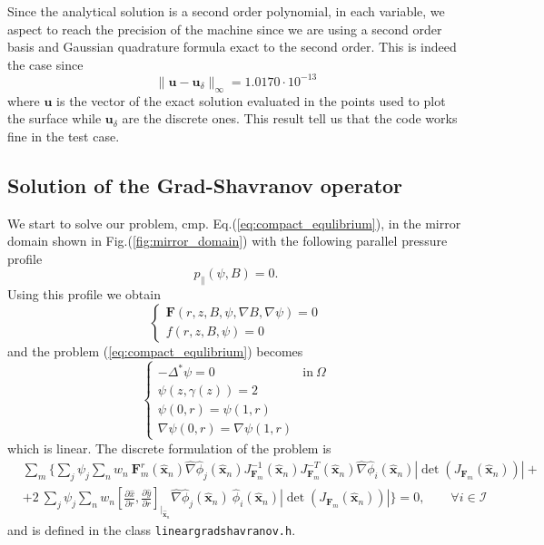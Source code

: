 Since the analytical solution is a second order polynomial, in each variable,  we aspect to reach the precision of the machine since we are using a second order basis and Gaussian quadrature formula exact to the second order. This is indeed the case since
\begin{equation}
\|\mathbf{u}-\mathbf{u}_{\delta}\|_{\infty}=1.0170\cdot 10^{-13}
\end{equation}
where $\mathbf{u}$ is the vector of the exact solution evaluated in the points used to plot the surface while $\mathbf{u}_{\delta}$ are the discrete ones. This result tell us that the code works fine in the test case.

\subsection{Solution of the Grad-Shavranov operator}\label{subsec:ex_gs_operator}
We start to solve our problem, cmp. Eq.(\ref{eq:compact_equlibrium}), in the mirror domain shown in Fig.(\ref{fig:mirror_domain}) with the following parallel pressure profile
\begin{equation}
  p_{\|}(\psi,B)=0.
\end{equation}
Using this profile we obtain
\begin{equation}
  \begin{cases}
    \mathbf{F}(r,z,B,\psi,\nabla B, \nabla\psi)=0\\
     f(r,z,B,\psi)=0
  \end{cases}
\end{equation}
and the problem (\ref{eq:compact_equlibrium}) becomes
\begin{equation}
  \begin{cases}
    -\Delta^*\psi=0 & \mathrm{in}\:\Omega\\
    \psi(z,\gamma(z))=2\\
    \psi(0,r)=\psi(1,r)\\
    \nabla\psi(0,r)=\nabla\psi(1,r)
  \end{cases}
\end{equation}
which is linear. The discrete formulation of the problem is
\begin{equation}
  \begin{split}
    &\sum_m \bigg\{\sum_j \psi_j \sum_n w_n\:\mathbf{F}_m^r(\mathbf{\hat{x}}_n)\hat{\nabla}\hat{\phi}_j(\mathbf{\hat{x}}_n)J_{\mathbf{F}_m}^{-1}(\mathbf{\hat{x}}_n)J_{\mathbf{F}_m}^{-T}(\mathbf{\hat{x}}_n)\hat{\nabla}\hat{\phi}_i(\mathbf{\hat{x}}_n)|\det(J_{\mathbf{F}_m}(\mathbf{\hat{x}}_n))| +\\
    &+2\:\sum_j\psi_j\sum_n w_n[\frac{\partial\hat{x}}{\partial r},\frac{\partial\hat{y}}{\partial r}]_{\big|_{\mathbf{\hat{x}}_n}}\hat{\nabla} \hat{\phi}_j(\mathbf{\hat{x}}_n)\:\hat{\phi}_i(\mathbf{\hat{x}}_n)|\det(J_{\mathbf{F}_m}(\mathbf{\hat{x}}_n))|\bigg\}=0, \qquad\forall i\in\mathcal{I}
  \end{split}
\end{equation}
and is defined in the class \verb|lineargradshavranov.h|.
\medskip

